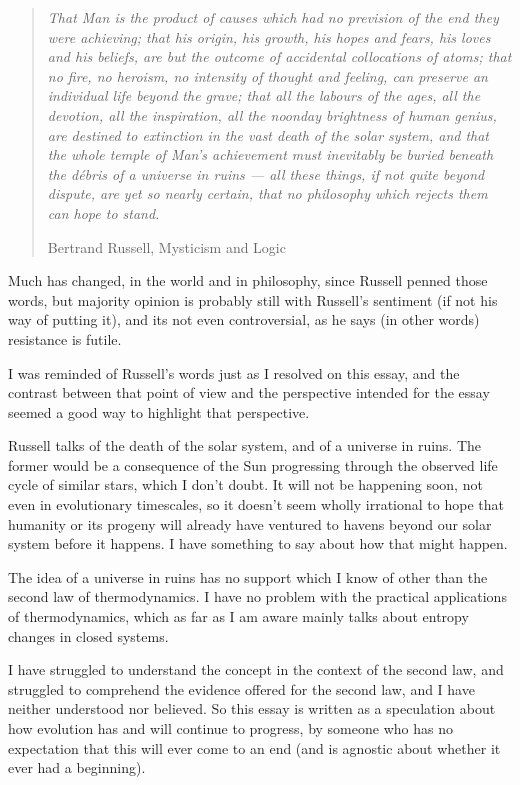 \documentclass[10pt,titlepage]{book}
\begin{document}
\begin{quote}
  \emph{That Man is the product of causes which had no prevision of the end they were achieving; that his origin, his growth, his hopes and fears, his loves and his beliefs, are but the outcome of accidental collocations of atoms; that no fire, no heroism, no intensity of thought and feeling, can preserve an individual life beyond the grave; that all the labours of the ages, all the devotion, all the inspiration, all the noonday brightness of human genius, are destined to extinction in the vast death of the solar system, and that the whole temple of Man's achievement must inevitably be buried beneath the débris of a universe in ruins — all these things, if not quite beyond dispute, are yet so nearly certain, that no philosophy which rejects them can hope to stand.}

Bertrand Russell, Mysticism and Logic \cite{russell17}
\end{quote}

Much has changed, in the world and in philosophy, since Russell penned those words, but majority opinion is probably still with Russell's sentiment (if not his way of putting it), and its not even controversial, as he says (in other words) resistance is futile.

I was reminded of Russell's words just as I resolved on this essay, and the contrast between that point of view and the perspective intended for the essay seemed a good way to highlight that perspective.

Russell talks of the death of the solar system, and of a universe in ruins.
The former would be a consequence of the Sun progressing through the observed life cycle of similar stars, which I don't doubt.
It will not be happening soon, not even in evolutionary timescales, so it doesn't seem wholly irrational to hope that humanity or its progeny will already have ventured to havens beyond our solar system before it happens.
I have something to say about how that might happen.

The idea of a universe in ruins has no support which I know of other than the second law of thermodynamics.
I have no problem with the practical applications of thermodynamics, which as far as I am aware mainly talks about entropy changes in closed systems.

I have struggled to understand the concept in the context of the second law, and struggled to comprehend the evidence offered for the second law, and I have neither understood nor believed.
So this essay is written as a speculation about how evolution has and will continue to progress, by someone who has no expectation that this will ever come to an end (and is agnostic about whether it ever had a beginning).
\end{document}
